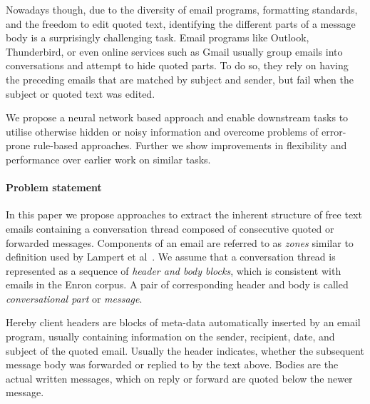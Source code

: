 \documentclass{llncs}
\begin{document}
Nowadays though, due to the diversity of email programs, formatting standards, and the freedom to edit quoted text, identifying the different parts of a message body is a surprisingly challenging task.
Email programs like Outlook, Thunderbird, or even online services such as Gmail usually group emails into conversations and attempt to hide quoted parts.
To do so, they rely on having the preceding emails that are matched by subject and sender, but fail when the subject or quoted text was edited.

We propose a neural network based approach and enable downstream tasks to utilise otherwise hidden or noisy information and overcome problems of error-prone rule-based approaches.
Further we show improvements in flexibility and performance over earlier work on similar tasks.






\paragraph{Problem statement}
In this paper we propose approaches to extract the inherent structure of free text emails containing a conversation thread composed of consecutive quoted or forwarded messages.
Components of an email are referred to as \textit{zones} similar to definition used by Lampert et al~\cite{zones}.
We assume that a conversation thread is represented as a sequence of \textit{header and body blocks}, which is consistent with emails in the Enron corpus.
A pair of corresponding header and body is called \textit{conversational part} or \textit{message}.

Hereby client headers are blocks of meta-data automatically inserted by an email program, usually containing information on the sender, recipient, date, and subject of the quoted email.
Usually the header indicates, whether the subsequent message body was forwarded or replied to by the text above.
Bodies are the actual written messages, which on reply or forward are quoted below the newer message.
\end{document}
